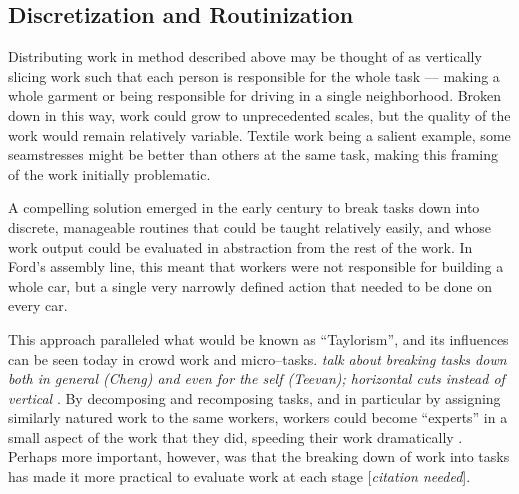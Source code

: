 \documentclass{sigchi}
\begin{document}







\subsection{Discretization and Routinization}

Distributing work in method described above may be thought of as vertically slicing work such that 
each person is responsible for the whole task
--- making a whole garment or being responsible for driving in a single neighborhood.
Broken down in this way, work could grow to unprecedented scales,
but the quality of the work would remain relatively variable.
Textile work being a salient example,
some seamstresses might be better than others at the same task,
making this framing of the work initially problematic.

A compelling solution emerged in the early  century to break tasks down into discrete,
manageable routines that could be taught relatively easily,
and whose work output could be evaluated in abstraction from the rest of the work.
In Ford's assembly line, this meant that workers were not responsible for building a whole car,
but a single very narrowly defined action that needed to be done on every car.

This approach paralleled what would be known as ``Taylorism'',
and its influences can be seen today in crowd work and micro--tasks.
\textit{talk about breaking tasks down both in general (Cheng) and even for the self (Teevan);
horizontal cuts instead of vertical}
\cite{cheng2015break,writingMicroTasks}.
By decomposing and recomposing tasks,
and in particular by assigning similarly natured work to the same workers,
workers could become ``experts'' in a small aspect of the work that they did,
speeding their work dramatically
\cite{delayAndOrderLasecki}.
Perhaps more important, however, was that
the breaking down of work into tasks has made it more practical to evaluate work at each stage
[\textit{citation needed}].
\end{document}
